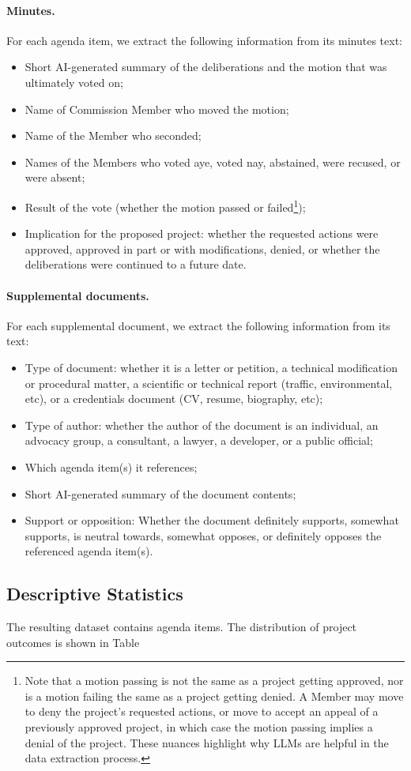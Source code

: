\paragraph{Minutes.} For each agenda item, we extract the following information from its minutes text:
\begin{itemize}
\item Short AI-generated summary of the deliberations and the motion that was ultimately voted on;
\item Name of Commission Member who moved the motion;
\item Name of the Member who seconded;
\item Names of the Members who voted aye, voted nay, abstained, were recused, or were absent;
\item Result of the vote (whether the motion passed or failed\footnote{Note that a motion passing is not the same as a project getting approved, nor is a motion failing the same as a project getting denied. A Member may move to deny the project's requested actions, or move to accept an appeal of a previously approved project, in which case the motion passing implies a denial of the project. These nuances highlight why LLMs are helpful in the data extraction process.});
\item Implication for the proposed project: whether the requested actions were approved, approved in part or with modifications, denied, or whether the deliberations were continued to a future date.
\end{itemize}

\paragraph{Supplemental documents.} For each supplemental document, we extract the following information from its text:
\begin{itemize}
\item Type of document: whether it is a letter or petition, a technical modification or procedural matter, a scientific or technical report (traffic, environmental, etc), or a credentials document (CV, resume, biography, etc); 
\item Type of author: whether the author of the document is an individual, an advocacy group, a consultant, a lawyer, a developer, or a public official;
\item Which agenda item(s) it references;
\item Short AI-generated summary of the document contents;
\item Support or opposition: Whether the document definitely supports, somewhat supports, is neutral towards, somewhat opposes, or definitely opposes the referenced agenda item(s).
\end{itemize}

\subsection{Descriptive Statistics} \label{sec_descriptive_statistics}

The resulting dataset contains  agenda items. The distribution of project outcomes is shown in Table 
